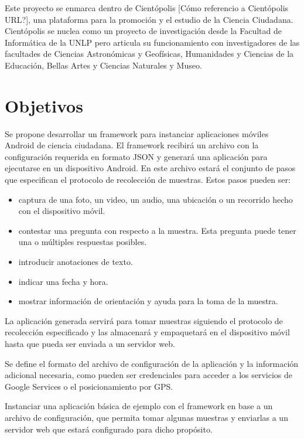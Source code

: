 Este proyecto se enmarca dentro de Cientópolis [Cómo referencio a Cientópolis URL?], una plataforma para la promoción y el estudio de la Ciencia Ciudadana. Cientópolis se nuclea como un proyecto de investigación desde la Facultad de Informática de la UNLP pero articula su funcionamiento con investigadores de las facultades de Ciencias Astronómicas y Geofísicas, Humanidades y Ciencias de la Educación, Bellas Artes y Ciencias Naturales y Museo.

\section{ Objetivos }		
		
Se propone desarrollar un framework para instanciar aplicaciones móviles Android de ciencia ciudadana. El framework recibirá un archivo con la configuración requerida en formato JSON y generará una aplicación para ejecutarse en un dispositivo Android. En este archivo estará el conjunto de pasos que especifican el protocolo de recolección de muestras. Estos pasos pueden ser:
			\begin{itemize}
				\item captura de una foto, un video, un audio, una ubicación o un recorrido hecho con el dispositivo móvil.
				\item contestar una pregunta con respecto a la muestra. Esta pregunta puede tener una o múltiples respuestas posibles.
				\item introducir anotaciones de texto.
				\item indicar una fecha y hora.
				\item mostrar información de orientación y ayuda para la toma de la muestra.
			\end{itemize}

La aplicación generada servirá para tomar muestras siguiendo el protocolo de recolección especificado y las almacenará y empaquetará en el dispositivo móvil hasta que pueda ser enviada a un servidor web.
		
Se define el formato del archivo de configuración de la aplicación y la información adicional necesaria, como pueden ser credenciales para acceder a los servicios de Google Services o el posicionamiento por GPS.

Instanciar una aplicación básica de ejemplo con el framework en base a un archivo de configuración, que permita tomar algunas muestras y enviarlas a un servidor web que estará configurado para dicho propósito.
			